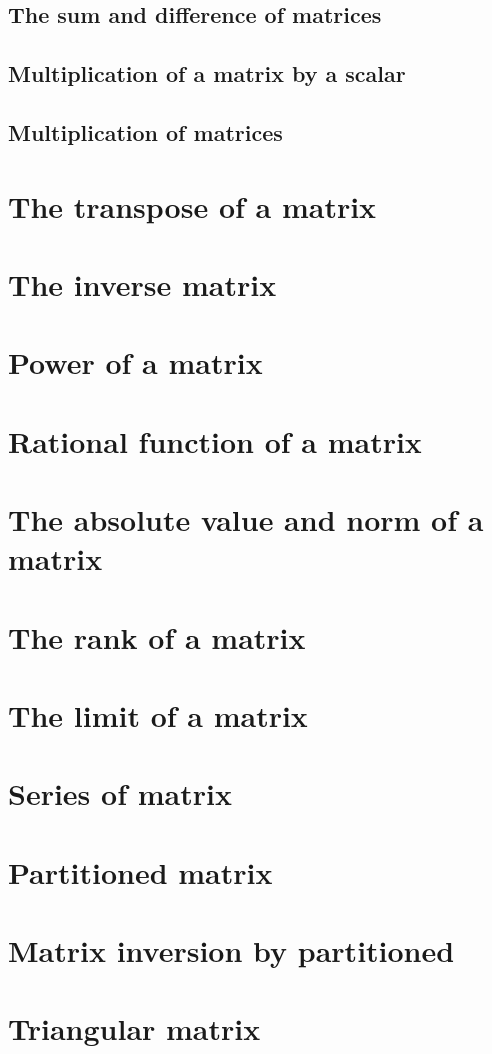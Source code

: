 \documentclass[13pt]{book}
\begin{document}
\subsection{The sum and difference of matrices}
\subsection{Multiplication of a matrix by a scalar}
\subsection{Multiplication of matrices}
\section{The transpose of a matrix}
\section{The inverse matrix}
\section{Power of a matrix}
\section{Rational function of a matrix}
\section{The absolute value and norm of a matrix}
\section{The rank of a matrix}
\section{The limit of a matrix}
\section{Series of matrix}
\section{Partitioned matrix}
\section{Matrix inversion by partitioned}
\section{Triangular matrix}
\end{document}
